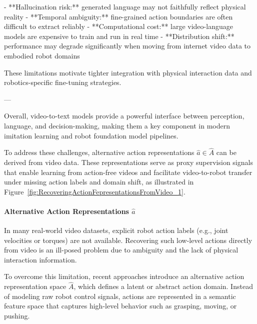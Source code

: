 - **Hallucination risk:** generated language may not faithfully reflect physical reality
- **Temporal ambiguity:** fine-grained action boundaries are often difficult to extract reliably
- **Computational cost:** large video-language models are expensive to train and run in real time
- **Distribution shift:** performance may degrade significantly when moving from internet video data to embodied robot domains

These limitations motivate tighter integration with physical interaction data and robotics-specific fine-tuning strategies.

---

Overall, video-to-text models provide a powerful interface between perception, language, and decision-making, making them a key component in modern imitation learning and robot foundation model pipelines.






















To address these challenges, alternative action representations $\hat{a} \in \hat{A}$ can be derived from video data. These representations serve as proxy supervision signals that enable learning from action-free videos and facilitate video-to-robot transfer under missing action labels and domain shift, as illustrated in Figure~\ref{fig:RecoveringActionFepresentationsFromVideo_1}.

\paragraph{Alternative Action Representations $\hat{a}$}

In many real-world video datasets, explicit robot action labels (e.g., joint velocities or torques) are not available. Recovering such low-level actions directly from video is an ill-posed problem due to ambiguity and the lack of physical interaction information.

To overcome this limitation, recent approaches introduce an alternative action representation space $\hat{A}$, which defines a latent or abstract action domain. Instead of modeling raw robot control signals, actions are represented in a semantic feature space that captures high-level behavior such as grasping, moving, or pushing.

